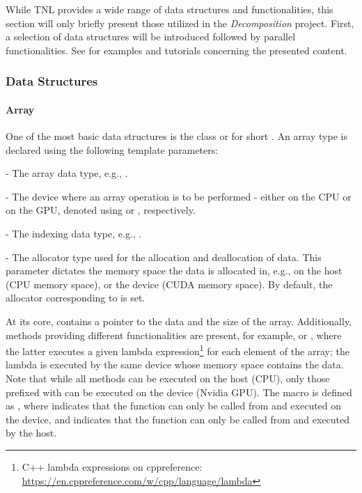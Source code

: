 While TNL provides a wide range of data structures and functionalities, this section will only briefly present those utilized in the \textit{Decomposition} project.
First, a selection of data structures will be introduced followed by parallel functionalities.
See  \cite{ixA8ZYptYohwlgwt} for examples and tutorials concerning the presented content.

\subsubsection{Data Structures}

\paragraph{Array} One of the most basic data structures is the  class or  for short \cite{ixA8ZYptYohwlgwt}.
An array type is declared using the following template parameters:

\begin{tight_itemize}
	\item {} - The array data type, e.g., .
	\item {} - The device where an array operation is to be performed - either on the CPU or on the GPU, denoted using  or , respectively.
	\item {} - The indexing data type, e.g., .
	\item {} - The allocator type used for the allocation and deallocation of data.
This parameter dictates the memory space the data is allocated in, e.g., on the host (CPU memory space), or the device (CUDA memory space).
By default, the allocator corresponding to  is set.
\end{tight_itemize}

At its core,  contains a pointer to the data and the size of the array.
Additionally, methods providing different functionalities are present, for example,  or , where the latter executes a given lambda expression\footnote{C++ lambda expressions on cppreference: \url{https://en.cppreference.com/w/cpp/language/lambda}} for each element of the array; the lambda is executed by the same device whose memory space contains the data.
Note that while all methods can be executed on the host (CPU), only those prefixed with  can be executed on the device (Nvidia GPU).
The  macro is defined as , where  indicates that the function can only be called from and executed on the device, and  indicates that the function can only be called from and executed by the host.

